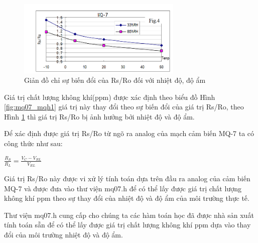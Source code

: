 \begin{figure}[H]
\centering    
\includegraphics[width=0.7\textwidth]{mq07_mqh2}
\caption[Giản đồ chỉ sự biến đổi của Rs/Ro đối với nhiệt độ, độ ẩm]{Giản đồ chỉ sự biến đổi của Rs/Ro đối với nhiệt độ, độ ẩm}
\label{fig:mq07_mqh2}
\end{figure}


Giá trị chất lượng không khí(ppm) được xác định theo biểu đồ Hình \ref{fig:mq07_mqh1} giá trị này thay đổi theo sự biến đổi của giá trị Rs/Ro, theo Hình \ref{fig:mq07_mqh2} thì giá trị Rs/Ro bị ảnh hưởng bởi nhiệt độ và độ ẩm.

Để xác định được giá trị Rs/Ro từ ngõ ra analog của mạch cảm biến MQ-7 ta có công thức như sau:
\begin{center}
$\displaystyle \frac{R_{S}}{R_{L}} = \frac{V_{C}-V_{RL}}{V_{RL}}$
\end{center}

Giá trị Rs/Ro này được vi xử lý tính toán dựa trên đầu ra analog của cảm biến MQ-7 và được đưa vào thư viện mq07.h để có thể lấy được giá trị chất lượng không khí ppm theo sự thay đổi của nhiệt độ và độ ẩm của môi trường thực tế.

Thư viện mq07.h cung cấp cho chúng ta các hàm toán học đã được nhà sản xuất tính toán sẵn để có thể lấy được giá trị chất lượng không khí ppm dựa vào thay đổi của môi trường nhiệt độ và độ ẩm.



